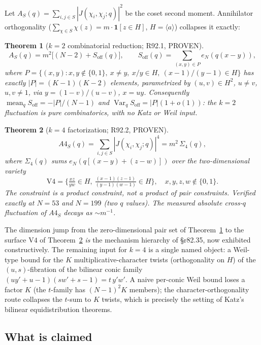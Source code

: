 \documentclass[11pt,reqno]{amsart}
\newtheorem{theorem}{Theorem}[section]
\theoremstyle{definition}
\begin{document}
Let $A_S(q) = \sum_{i,j \in S} |J(\chi_i,\chi_j;q)|^2$ be the coset second
moment.  Annihilator orthogonality
($\sum_{\chi \in S} \chi(z) = m \cdot \mathbf{1}[z \in H]$,
$H = \langle a\rangle$) collapses it exactly:

\begin{theorem}[$k=2$ combinatorial reduction; R92.1, PROVEN]
\label{thm:k2}
\[
  A_S(q) = m^2\big[(N{-}2) + S_{\mathrm{off}}(q)\big],
  \qquad
  S_{\mathrm{off}}(q) = \sum_{(x,y) \in P} e_N(q(x-y)),
\]
where
$P = \{(x,y) : x,y \notin \{0,1\},\ x \ne y,\ x/y \in H,\ (x{-}1)/(y{-}1) \in H\}$
has exactly $|P| = (K{-}1)(K{-}2)$ elements, parametrized by
$(u,v) \in H^2$, $u \ne v$, $u,v \ne 1$, via
$y = (1{-}v)/(u{-}v)$, $x = uy$.  Consequently
$\operatorname{mean}_q S_{\mathrm{off}} = -|P|/(N{-}1)$ and
$\operatorname{Var}_q S_{\mathrm{off}} = |P|(1 + o(1))$: the $k{=}2$
fluctuation is pure combinatorics, with no Katz or Weil input.
\end{theorem}

\begin{theorem}[$k=4$ factorization; R92.2, PROVEN]
\label{thm:k4}
\[
  A4_S(q) = \sum_{i,j \in S} |J(\chi_i,\chi_j;q)|^4 = m^2\,\Sigma_4(q),
\]
where $\Sigma_4(q)$ sums $e_N(q[(x{-}y){+}(z{-}w)])$ over the
two-dimensional variety
\[
  \mathrm{V4} = \Big\{ \tfrac{xz}{yw} \in H,\
  \tfrac{(x-1)(z-1)}{(y-1)(w-1)} \in H \Big\}, \quad x,y,z,w \notin \{0,1\}.
\]
The constraint is a product constraint, not a product of pair constraints.
Verified exactly at $N = 53$ and $N = 199$ (two $q$ values).  The measured
absolute cross-$q$ fluctuation of $A4_S$ decays as $\sim m^{-1}$.
\end{theorem}

The dimension jump from the zero-dimensional pair set of
Theorem~\ref{thm:k2} to the surface $\mathrm{V4}$ of
Theorem~\ref{thm:k4} \emph{is} the mechanism hierarchy of \S r82.35, now
exhibited constructively.  The remaining input for $k = 4$ is a single
named object: a Weil-type bound for the $K$ multiplicative-character
twists (orthogonality on $H$) of the $(u,s)$-fibration of the bilinear
conic family $(uy' + u - 1)(sw' + s - 1) = t\,y'w'$.  A naive per-conic
Weil bound loses a factor $K$ (the $t$-family has $(N{-}1)^2 K$ members);
the character-orthogonality route collapses the $t$-sum to $K$ twists,
which is precisely the setting of Katz's bilinear equidistribution
theorems.

\subsection{What is claimed}
\end{document}
